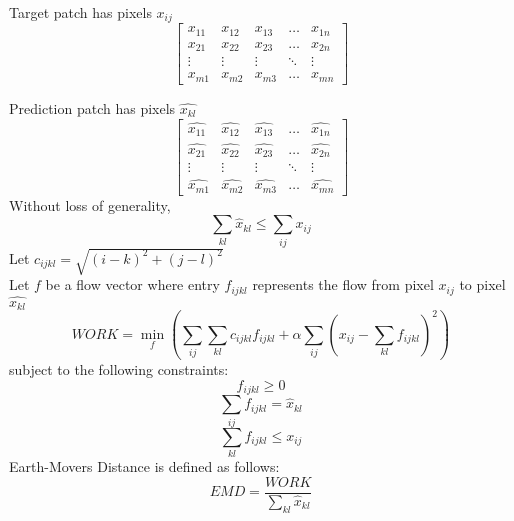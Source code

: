 \documentclass[twoside,11pt]{article}
\theoremstyle{definition}
\begin{document}
Target patch has pixels $x_{ij}$\\
\[
\begin{bmatrix}
    x_{11} & x_{12} & x_{13} & \dots  & x_{1n} \\
    x_{21} & x_{22} & x_{23} & \dots  & x_{2n} \\
    \vdots & \vdots & \vdots & \ddots & \vdots \\
    x_{m1} & x_{m2} & x_{m3} & \dots  & x_{mn}
\end{bmatrix}
\]

Prediction patch has pixels $\hat{x_{kl}}$\\
\[
\begin{bmatrix}
    \hat{x_{11}} & \hat{x_{12}} & \hat{x_{13}} & \dots  & \hat{x_{1n}} \\
    \hat{x_{21}} & \hat{x_{22}} & \hat{x_{23}} & \dots  & \hat{x_{2n}} \\
    \vdots & \vdots & \vdots & \ddots & \vdots \\
    \hat{x_{m1}} & \hat{x_{m2}} & \hat{x_{m3}} & \dots  & \hat{x_{mn}}
\end{bmatrix}
\]
Without loss of generality, 
\[
\sum_{kl}{\hat{x}_{kl}} \leq \sum_{ij}{x_{ij}}
\]
Let $c_{ijkl} = \sqrt{(i-k)^2 + (j-l)^2}$ \\
Let $f$ be a flow vector where entry $f_{ijkl}$ represents the flow from pixel $x_{ij}$ to pixel $\hat{x_{kl}}$\\
\[
WORK = \min_f(\sum_{ij}{\sum_{kl}{c_{ijkl} f_{ijkl}}} + \alpha \sum_{ij}{(x_{ij} - \sum_{kl}{f_{ijkl}})^2})
\]
subject to the following constraints:\\
\[
f_{ijkl} \geq 0
\]
\[
\sum_{ij}{f_{ijkl}} = \hat{x}_{kl}
\]
\[
\sum_{kl}{f_{ijkl}} \leq x_{ij}
\]
Earth-Movers Distance is defined as follows:
\[
EMD = \frac{WORK}{\sum_{kl}{\hat{x}_{kl}}}
\]
\end{document}
